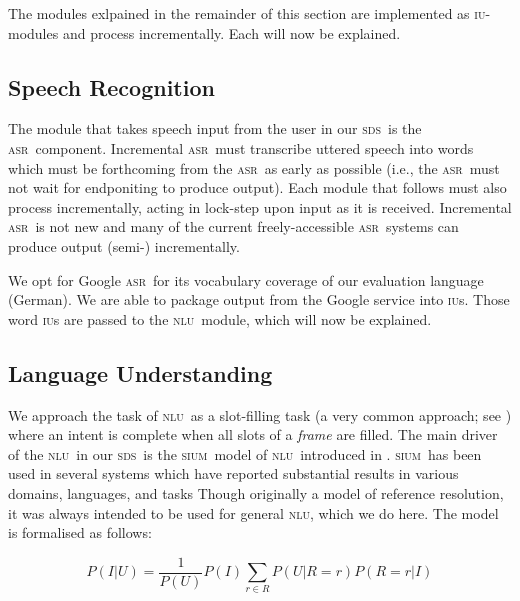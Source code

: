 \documentclass[11pt]{article}
\newcommand{\sds}[0]{\textsc{sds}}
\newcommand{\nlu}[0]{\textsc{nlu}}
\newcommand{\sium}[0]{\textsc{sium}}
\newcommand{\asr}[0]{\textsc{asr}}
\newcommand{\iu}[0]{\textsc{iu}}
\begin{document}
The modules exlpained in the remainder of this section are implemented as \iu-modules and process incrementally. Each will now be explained. 

\subsection{Speech Recognition}

The module that takes speech input from the user in our \sds\ is the \asr\ component. Incremental \asr\ must transcribe uttered speech into words which must be forthcoming from the \asr\ as early as possible (i.e., the \asr\ must not wait for endponiting to produce output). Each module that follows must also process incrementally, acting in lock-step upon input as it is received. Incremental \asr\ is not new \cite{baumannetal2009:naacl} and many of the current freely-accessible \asr\ systems can produce output (semi-) incrementally. 

We opt for Google \asr\ for its vocabulary coverage of our evaluation language (German). We are able to package output from the Google service into \iu s. Those word \iu s are passed to the \nlu\ module, which will now be explained. 

\subsection{Language Understanding}

We approach the task of \nlu\ as a slot-filling task (a very common approach; see ) where an intent is complete when all slots of a \emph{frame} are filled. The main driver of the \nlu\ in our \sds\ is the \sium\ model of \nlu\ introduced in . \sium\ has been used in several systems which have reported substantial results in various domains, languages, and tasks \cite{Kennington2014_coling,Kennington2015_naacl,Kennington2016} Though originally a model of reference resolution, it was always intended to be used for general \nlu, which we do here. The model is formalised as follows:

\vspace{-0.25cm}
{\small
\begin{center}
\begin{equation}
   P(I|U) = \frac{1}{P(U)} P(I)\sum_{r\in R} P(U|R=r)P(R=r|I) 
\label{eq:disc1}
\end{equation}
\end{center}
}
\end{document}
